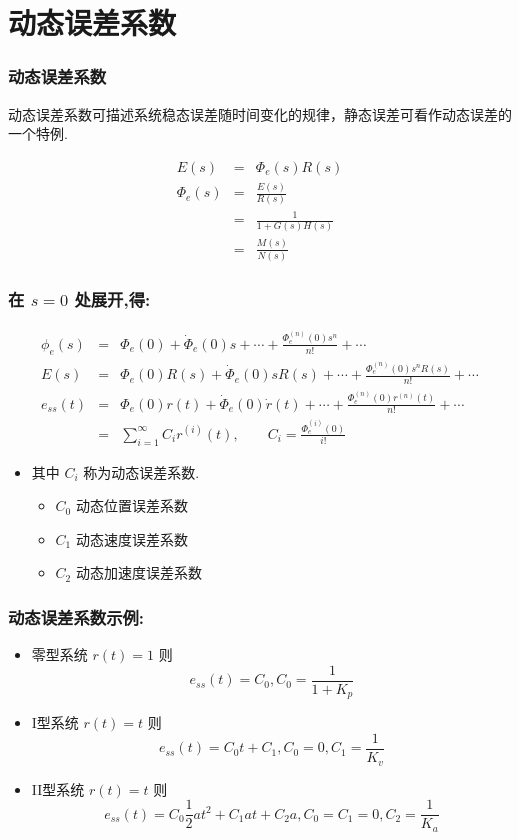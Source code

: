 \documentclass{beamer}
\begin{document}
\section{动态误差系数}
\label{sec-3}
\begin{frame}
\frametitle{动态误差系数}
\label{sec-3-1}

动态误差系数可描述系统稳态误差随时间变化的规律，静态误差可看作动态误差的一个特例.

\begin{eqnarray*}
E(s) & = & \Phi_e(s)R(s)\\
\Phi_e(s) &=& \frac{E(s)}{R(s)}\\
         &=&\frac{1}{1+G(s)H(s)} \\
         &=& \frac{M(s)}{N(s)} 
\end{eqnarray*}
\end{frame}
\begin{frame}
\frametitle{在 $s=0$ 处展开,得:}
\label{sec-3-2}


\begin{eqnarray*}
\phi_e(s)  &=& \Phi_e(0)+\dot{\Phi}_e(0)s+\cdots+\frac{\Phi_e^{(n)}(0)s^n}{n!}+\cdots \\
E(s) & = & \Phi_e(0)R(s)+\dot{\Phi}_e(0)sR(s)+\cdots+\frac{\Phi_e^{(n)}(0)s^nR(s)}{n!}+\cdots \\
e_{ss}(t) & = & \Phi_e(0)r(t)+\dot{\Phi}_e(0)\dot{r}(t)+\cdots+\frac{\Phi_e^{(n)}(0)r^{(n)}(t)}{n!}+\cdots \\
          &= & \sum_{i=1}^{\infty}C_ir^{(i)}(t) ,\qquad
C_i = \frac{\Phi_e^{(i)}(0)}{i!}
\end{eqnarray*}

\begin{itemize}
\item 其中 $C_i$ 称为动态误差系数.
\begin{itemize}
\item $C_0$ 动态位置误差系数
\item $C_1$ 动态速度误差系数
\item $C_2$ 动态加速度误差系数
\end{itemize}
\end{itemize}
\end{frame}
\begin{frame}
\frametitle{动态误差系数示例:}
\label{sec-3-3}

\begin{itemize}
\item <2-> 零型系统 $r(t)=1$ 则 \[e_{ss}(t)=C_0 ,C_0=\frac{1}{1+K_p}\]
\item <3-> I型系统 $r(t)=t$ 则 \[e_{ss}(t)=C_0 t+C_1,C_0=0,C_1=\frac{1}{K_v}\]
\item <4-> II型系统 $r(t)=t$ 则 \[e_{ss}(t)=C_0 \frac{1}{2}at^2+C_1at+C_2 a,C_0=C_1=0,C_2=\frac{1}{K_a}\]
\end{itemize}
\end{frame}
\end{document}
